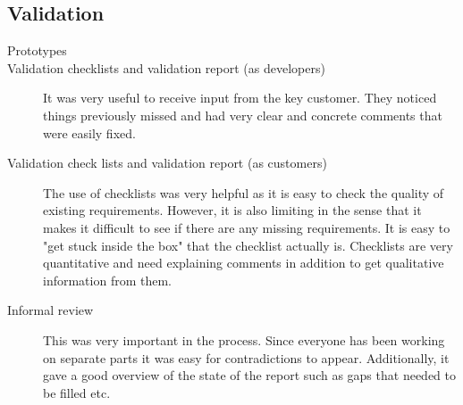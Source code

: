 \documentclass[10pt,a4paper]{article}
\begin{document}
\subsection{Validation}
\begin{description}
\item[Prototypes]

\item[Validation checklists and validation report (as developers)] It was very useful to receive input from the key customer. They noticed things previously missed and had very clear and concrete comments that were easily fixed. 


\item[Validation check lists and validation report (as customers)] The use of checklists was very helpful as it is easy to check the quality of existing requirements. However, it is also limiting in the sense that it makes it difficult to see if there are any missing requirements. It is easy to "get stuck inside the box" that the checklist actually is. Checklists are very quantitative and need explaining comments in addition to get qualitative information from them.

\item[Informal review] This was very important in the process. Since everyone has been working on separate parts it was easy for contradictions to appear. Additionally, it gave a good overview of the state of the report such as gaps that needed to be filled etc.


\end{description}

\end{document}
